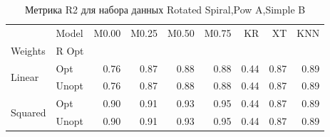 \begin{table}
\caption{Метрика R2 для набора данных Rotated Spiral,Pow A,Simple B}
\label{tab:R2_Rotated Spiral,Pow A,Simple B}
\begin{tabular}{llrrrrrrr}
\toprule
 & Model & M0.00 & M0.25 & M0.50 & M0.75 & KR & XT & KNN \\
Weights & R Opt &  &  &  &  &  &  &  \\
\midrule
\multirow[t]{2}{*}{Linear} & Opt & 0.76 & 0.87 & 0.88 & 0.88 & 0.44 & 0.87 & 0.89 \\
 & Unopt & 0.76 & 0.87 & 0.88 & 0.88 & 0.44 & 0.87 & 0.89 \\

\multirow[t]{2}{*}{Squared} & Opt & 0.90 & 0.91 & 0.93 & 0.95 & 0.44 & 0.87 & 0.89 \\
 & Unopt & 0.90 & 0.91 & 0.93 & 0.95 & 0.44 & 0.87 & 0.89 \\

\bottomrule
\end{tabular}
\end{table}
